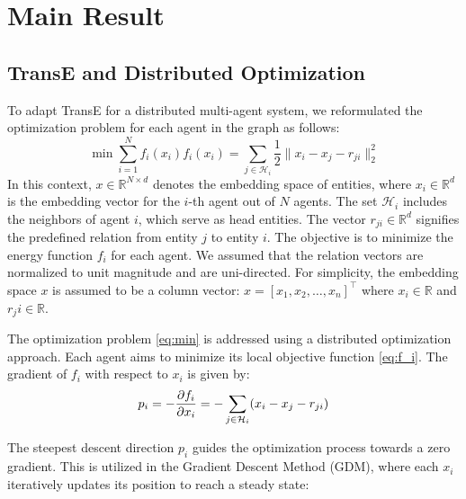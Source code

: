 \documentclass[letterpaper, 10 pt, conference]{ieeeconf}  %
\begin{document}
\section{Main Result}

\subsection{TransE and Distributed Optimization}
To adapt TransE for a distributed multi-agent system, we reformulated the optimization problem for each agent in the graph as follows:
\begin{subequations}
\begin{equation}\label{eq:min}
    \min \sum_{i=1}^{N} f_{i} (x_{i})
\end{equation}
\begin{equation}\label{eq:f_i}
    f_{i}(x_{i}) = \sum_{j \in \mathcal{H}_{i}} \frac{1}{2} \|x_{i} - x_{j} - r_{ji}\|_{2}^{2}
\end{equation}
\end{subequations}
In this context, \( x \in \mathbb{R}^{N \times d} \) denotes the embedding space of entities, where \( x_i \in \mathbb{R}^d \) is the embedding vector for the \(i\)-th agent out of \( N \) agents. The set \( \mathcal{H}_i \) includes the neighbors of agent \( i \), which serve as head entities. The vector \( r_{ji} \in \mathbb{R}^d \) signifies the predefined relation from entity \( j \) to entity \( i \). The objective is to minimize the energy function \( f_i \) for each agent. We assumed that the relation vectors are normalized to unit magnitude and are uni-directed. For simplicity, the embedding space \(x\) is assumed to be a column vector: \(x = [x_1, x_2, \ldots, x_n]^\top\) where \(x_i \in \mathbb{R}\) and \(r_ji \in \mathbb{R}\).

The optimization problem \eqref{eq:min} is addressed using a distributed optimization approach. Each agent aims to minimize its local objective function \eqref{eq:f_i}. The gradient of \( f_i \) with respect to \( x_i \) is given by:
\begin{equation}
    p_i = - \pdv{f_{i}}{x_{i}} = - \sum_{j \in \mathcal{H}_i} (x_{i} - x_{j} - r_{ji})
    \label{eq:p}
\end{equation}

The steepest descent direction \( p_i \) guides the optimization process towards a zero gradient. This is utilized in the Gradient Descent Method (GDM), where each \( x_i \) iteratively updates its position to reach a steady state:
\end{document}
